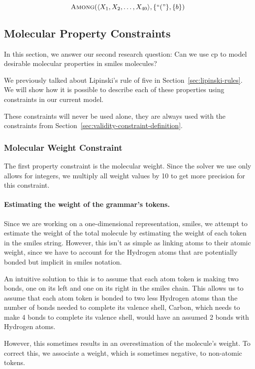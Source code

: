 \documentclass[../Document.tex]{subfiles}
\begin{document}
$$
    \mbox{\sc Among}(\langle X_1, X_2, \ldots, X_{40} \rangle, \{``("\}, \{b\})
$$


\subsection{Molecular Property Constraints}
In this section, we answer our second research question: Can we use \acrshort{cp} to model desirable molecular properties in \acrshort{smiles} molecules?

We previously talked about Lipinski's rule of five in Section~\ref{sec:lipinski-rules}. We will show how it is possible to describe each of these properties using constraints in our current model.

These constraints will never be used alone, they are always used with the constraints from Section~\ref{sec:validity-constraint-definition}.

\subsubsection{Molecular Weight Constraint}
The first property constraint is the molecular weight.
Since the solver we use only allows for integers, we multiply all weight values by 10 to get more precision for this constraint.

\paragraph{Estimating the weight of the grammar's tokens.}
Since we are working on a one-dimensional representation, \gls{smiles}, we attempt to estimate the weight of the total molecule by estimating the weight of each token in the \gls{smiles} string.
However, this isn't as simple as linking atoms to their atomic weight, since we have to account for the Hydrogen atoms that are potentially bonded but implicit in \gls{smiles} notation.

An intuitive solution to this is to assume that each atom token is making two bonds, one on its left and one on its right in the \gls{smiles} chain.
This allows us to assume that each atom token is bonded to two less Hydrogen atoms than the number of bonds needed to complete its valence shell, \eg Carbon, which needs to make 4 bonds to complete its valence shell, would have an assumed 2 bonds with Hydrogen atoms.

However, this sometimes results in an overestimation of the molecule's weight.
To correct this, we associate a weight, which is sometimes negative, to non-atomic tokens.
\end{document}
